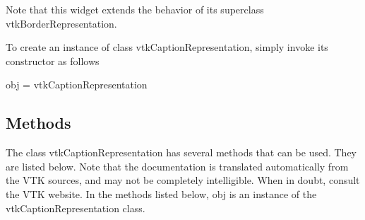 Note that this widget extends the behavior of its superclass vtk\-Border\-Representation.

To create an instance of class vtk\-Caption\-Representation, simply invoke its constructor as follows \begin{DoxyVerb}  obj = vtkCaptionRepresentation
\end{DoxyVerb}
 \hypertarget{vtkwidgets_vtkxyplotwidget_Methods}{}\subsection{Methods}\label{vtkwidgets_vtkxyplotwidget_Methods}
The class vtk\-Caption\-Representation has several methods that can be used. They are listed below. Note that the documentation is translated automatically from the V\-T\-K sources, and may not be completely intelligible. When in doubt, consult the V\-T\-K website. In the methods listed below, {\ttfamily obj} is an instance of the vtk\-Caption\-Representation class. 
